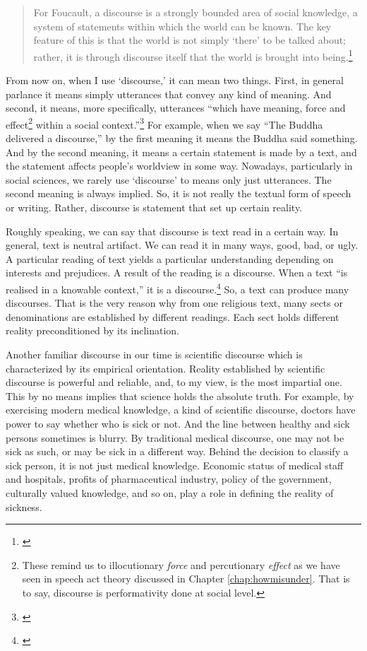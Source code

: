 \begin{quote}
For Foucault, a discourse is a strongly bounded area of social knowledge, a system of statements within which the world can be known. The key feature of this is that the world is not simply `there' to be talked about; rather, it is through discourse itself that the world is brought into being.\footnote{\citealp[p.~83]{ashcroft:postcolonial}}
\end{quote}

From now on, when I use `discourse,' it can mean two things. First, in general parlance it means simply utterances that convey any kind of meaning. And second, it means, more specifically, utterances ``which have meaning, force and effect\footnote{These remind us to illocutionary \emph{force} and percutionary \emph{effect} as we have seen in speech act theory discussed in Chapter \ref{chap:howmisunder}. That is to say, discourse is performativity done at social level.} within a social context.''\footnote{\citealp[p.~11]{mills:discourse}} For example, when we say ``The Buddha delivered a discourse,'' by the first meaning it means the Buddha said something. And by the second meaning, it means a certain statement is made by a text, and the statement affects people's worldview in some way. Nowadays, particularly in social sciences, we rarely use `discourse' to means only just utterances. The second meaning is always implied. So, it is not really the textual form of speech or writing. Rather, discourse is statement that set up certain reality.

Roughly speaking, we can say that discourse is text read in a certain way. In general, text is neutral artifact. We can read it in many ways, good, bad, or ugly. A particular reading of text yields a particular understanding depending on interests and prejudices. A result of the reading is a discourse. When a text ``is realised in a knowable context,'' it is a discourse.\footnote{\citealp[p.~8]{greenlebihan:critical}} So, a text can produce many discourses. That is the very reason why from one religious text, many sects or denominations are established by different readings. Each sect holds different reality preconditioned by its inclination.

Another familiar discourse in our time is scientific discourse which is characterized by its empirical orientation. Reality established by scientific discourse is powerful and reliable, and, to my view, is the most impartial one. This by no means implies that science holds the absolute truth. For example, by exercising modern medical knowledge, a kind of scientific discourse, doctors have power to say whether who is sick or not. And the line between healthy and sick persons sometimes is blurry. By traditional medical discourse, one may not be sick as such, or may be sick in a different way. Behind the decision to classify a sick person, it is not just medical knowledge. Economic status of medical staff and hospitals, profits of pharmaceutical industry, policy of the government, culturally valued knowledge, and so on, play a role in defining the reality of sickness.

